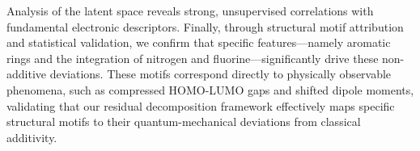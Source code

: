 \documentclass[]{article}
\begin{document}
\citep{shui2020heterogeneousmoleculargraphneural,liu2021fastquantumpropertyprediction,rittig2022graphneuralnetworksprediction} Analysis of the latent space reveals strong, unsupervised correlations with fundamental electronic descriptors. \citep{lu2019molecularpropertypredictionmultilevel,liu2021fastquantumpropertyprediction,arjonamedina2024analysisatomlevelpretrainingquantum} Finally, through structural motif attribution and statistical validation, we confirm that specific features—namely aromatic rings and the integration of nitrogen and fluorine—significantly drive these non-additive deviations. \citep{shui2020heterogeneousmoleculargraphneural,wang2022motifbasedgraphrepresentationlearning,yu2025magemodellevelgraphneural} These motifs correspond directly to physically observable phenomena, such as compressed HOMO-LUMO gaps and shifted dipole moments, validating that our residual decomposition framework effectively maps specific structural motifs to their quantum-mechanical deviations from classical additivity. \citep{lu2019molecularpropertypredictionmultilevel,shui2020heterogeneousmoleculargraphneural,liu2021fastquantumpropertyprediction}
\end{document}
